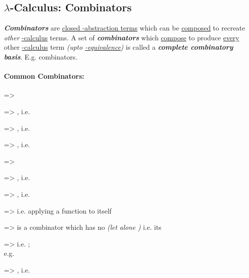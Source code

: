 \subsection*{\texorpdfstring{$\lambda$-Calculus: Combinators}{-Calculus: Combinators}}

\textbf{\textit{Combinators}} are \ul{closed \iMbox{\lambda}-abstraction
    terms} which can be \ul{composed} to recreate \textit{other}
\ul{\iMbox{\lambda}-calculus} terms. A set of
\textbf{\textit{combinators}} which \ul{compose} to produce \ul{every}
other \ul{\iMbox{\lambda}-calculus} term \textit{(upto
    \ul{\iMbox{\beta \eta}-equivalence})} is called a
\textbf{\textit{complete combinatory basis}}. E.g.  combinators.

\hSep
\vspace{2pt}

\paragraph*{Common Combinators:}

 => 

 =>
, i.e. 

 => ,
i.e. 

 => , i.e. 

 => 

 => , i.e. 

 => ,
i.e. 

 => 
i.e. applying a function to itself

 => \iMbox{\Omega \equiv \omega \omega} is a 
combinator which has no  \textit{(let alone
    )} i.e. its 

 => 
i.e. ; \\
e.g. 

 => , i.e. 

